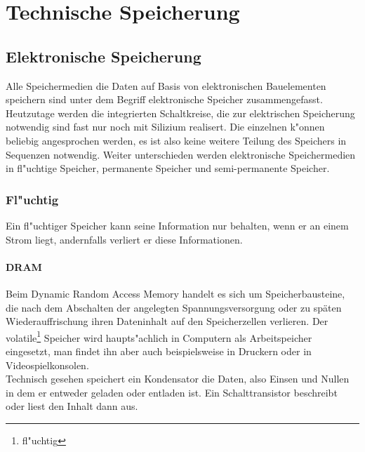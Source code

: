 
\chapter{Technische Speicherung}
\label{ch:Technische Speicherung}

    \section{Elektronische Speicherung}
    \label{ch:Technisch:sec:Elektronische Speicherung}
	
	Alle Speichermedien die Daten auf Basis von elektronischen Bauelementen speichern sind unter dem Begriff elektronische Speicher zusammengefasst. Heutzutage werden die integrierten Schaltkreise, die zur elektrischen Speicherung notwendig sind fast nur noch mit Silizium realisert. Die einzelnen k"onnen beliebig angesprochen werden, es ist also keine weitere Teilung des Speichers in Sequenzen notwendig. Weiter unterschieden werden elektronische Speichermedien in fl"uchtige Speicher, permanente Speicher und semi-permanente Speicher.
	
        \subsection{Fl"uchtig}
        \label{ch:Technisch:sec:Elektronische Speicherung:sub:Fl"uchtig}
        
            Ein fl"uchtiger Speicher kann seine Information nur behalten, wenn er an einem Strom liegt, andernfalls verliert er diese Informationen.
				
				\subsubsection{DRAM}
				\label{ch:Technisch:sec:Elektronische Speicherung:sub:Fl"uchtig:subsub:DRAM}
				
					Beim \glqq Dynamic Random Access Memory\grqq{} handelt es sich um Speicherbausteine, die nach dem Abschalten der angelegten Spannungsversorgung oder zu späten Wiederauffrischung ihren Dateninhalt auf den Speicherzellen verlieren. Der volatile\footnote{fl"uchtig} Speicher wird haupts"achlich in Computern als Arbeitspeicher eingesetzt, man findet ihn aber auch beispielsweise in Druckern oder in Videospielkonsolen.
					\\
					Technisch gesehen speichert ein Kondensator die Daten, also Einsen und Nullen in dem er entweder geladen oder entladen ist. Ein Schalttransistor beschreibt oder liest den Inhalt dann aus.
				
